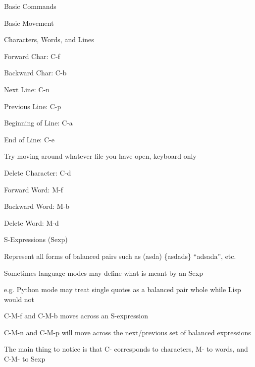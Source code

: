 \documentclass[presentation]{beamer}
\begin{document}
\begin{frame}[label=sec-2]{Basic Commands}
\begin{block}{Basic Movement}
\begin{block}{Characters, Words, and Lines}
\begin{block}{Forward Char: C-f}
\end{block}
\begin{block}{Backward Char: C-b}
\end{block}
\begin{block}{Next Line: C-n}
\end{block}
\begin{block}{Previous Line: C-p}
\end{block}
\begin{block}{Beginning of Line: C-a}
\end{block}
\begin{block}{End of Line: C-e}
\end{block}
\begin{block}{Try moving around whatever file you have open, keyboard only}
\end{block}
\begin{block}{Delete Character: C-d}
\end{block}
\begin{block}{Forward Word: M-f}
\end{block}
\begin{block}{Backward Word: M-b}
\end{block}
\begin{block}{Delete Word: M-d}
\end{block}
\end{block}
\begin{block}{S-Expressions (Sexp)}
\begin{block}{Represent all forms of balanced pairs such as (asda) \{asdads\} ``adsada'', etc.}
\end{block}
\begin{block}{Sometimes language modes may define what is meant by an Sexp}
\begin{block}{e.g. Python mode may treat single quotes as a balanced pair whole while Lisp would not}
\end{block}
\end{block}
\begin{block}{C-M-f and C-M-b moves across an S-expression}
\end{block}
\begin{block}{C-M-n and C-M-p will move across the next/previous set of balanced expressions}
\end{block}
\begin{block}{The main thing to notice is that C- corresponds to characters, M- to words, and C-M- to Sexp}

\end{block}
\end{block}
\end{block}
\end{frame}
\end{document}
